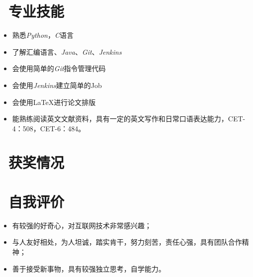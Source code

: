 \documentclass{resume}
\begin{document}
\section{\faCogs\ 专业技能}
\begin{itemize}[parsep=1ex]
  \item 熟悉\emph{Python}，\emph{C}语言
  \item 了解汇编语言、\emph{Java}、\emph{Git}、\emph{Jenkins}
  \item 会使用简单的\emph{Git}指令管理代码
  \item 会使用\emph{Jenkins}建立简单的Job
  \item 会使用\LaTeX 进行论文排版 
  \item 能熟练阅读英文文献资料，具有一定的英文写作和日常口语表达能力，CET-4：508，CET-6：484。

\end{itemize}

\section{\faHeartO\ 获奖情况}
\begin{itemize}[parsep=0.5ex]

\end{itemize}

\section{\faInfo\ 自我评价}
\begin{itemize}[parsep=0.5ex]
  \item 有较强的好奇心，对互联网技术非常感兴趣；
  \item 与人友好相处，为人坦诚，踏实肯干，努力刻苦，责任心强，具有团队合作精神；
  \item 善于接受新事物，具有较强独立思考，自学能力。
\end{itemize}

%
%
\end{document}
